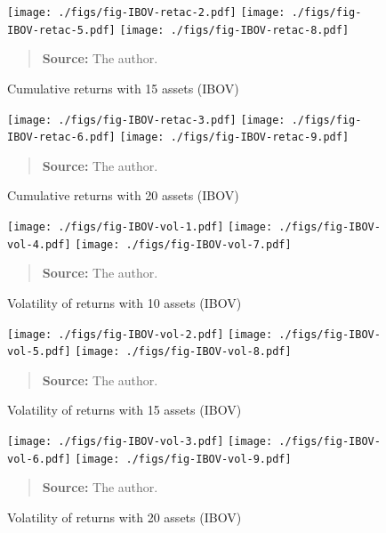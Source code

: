 \documentclass[12pt,oneside,a4paper]{memoir}
\begin{document}
\begin{figure}[htpb]
\centering
\footnotesize
\caption{Cumulative returns with 15 assets (IBOV)}
\label{fig:ibov:ret:15a}
\texttt{[image: ./figs/fig-IBOV-retac-2.pdf]}
\texttt{[image: ./figs/fig-IBOV-retac-5.pdf]}
\texttt{[image: ./figs/fig-IBOV-retac-8.pdf]}
\begin{quote}
\textbf{Source:} The author.
\end{quote}
\end{figure}

\begin{figure}[htpb]
\centering
\footnotesize
\caption{Cumulative returns with 20 assets (IBOV)}
\label{fig:ibov:ret:20a}
\texttt{[image: ./figs/fig-IBOV-retac-3.pdf]}
\texttt{[image: ./figs/fig-IBOV-retac-6.pdf]}
\texttt{[image: ./figs/fig-IBOV-retac-9.pdf]}
\begin{quote}
\textbf{Source:} The author.
\end{quote}
\end{figure}


\begin{figure}[htpb]
\centering
\footnotesize
\caption{Volatility of returns with 10 assets (IBOV)}
\label{fig:ibov:vol:10a}
\texttt{[image: ./figs/fig-IBOV-vol-1.pdf]}
\texttt{[image: ./figs/fig-IBOV-vol-4.pdf]}
\texttt{[image: ./figs/fig-IBOV-vol-7.pdf]}
\begin{quote}
\textbf{Source:} The author.
\end{quote}
\end{figure}

\begin{figure}[htpb]
\centering
\footnotesize
\caption{Volatility of returns with 15 assets (IBOV)}
\label{fig:ibov:vol:15a}
\texttt{[image: ./figs/fig-IBOV-vol-2.pdf]}
\texttt{[image: ./figs/fig-IBOV-vol-5.pdf]}
\texttt{[image: ./figs/fig-IBOV-vol-8.pdf]}
\begin{quote}
\textbf{Source:} The author.
\end{quote}
\end{figure}

\begin{figure}[htpb]
\centering
\footnotesize
\caption{Volatility of returns with 20 assets (IBOV)}
\label{fig:ibov:vol:20a}
\texttt{[image: ./figs/fig-IBOV-vol-3.pdf]}
\texttt{[image: ./figs/fig-IBOV-vol-6.pdf]}
\texttt{[image: ./figs/fig-IBOV-vol-9.pdf]}
\begin{quote}
\textbf{Source:} The author.
\end{quote}
\end{figure}
\end{document}
